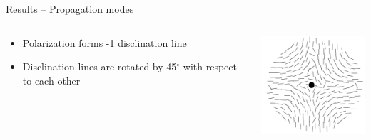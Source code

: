 \documentclass{beamer}
\newlength{\wideitemsep}
\let\olditem\item
\renewcommand{\item}{\setlength{\itemsep}{\wideitemsep}\olditem}
\begin{document}
\begin{frame}{Results -- Propagation modes}
\begin{block}{}
\end{block}

\begin{block}{}
\begin{columns}
  \begin{column}{.7\textwidth}
\begin{itemize}
  \item Polarization forms -1 disclination line
  \item Disclination lines are rotated by 45$^\circ$ with respect to each other
\end{itemize}
  \end{column}

\begin{column}{.15\textwidth}
  \includegraphics[width=\textwidth]{disclination2}
\end{column}

\end{columns}

\end{block}

\end{frame}
\end{document}
